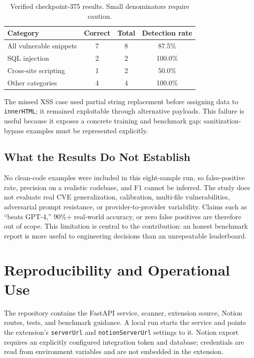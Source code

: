 \documentclass[10pt,conference]{IEEEtran}
\begin{document}
\begin{table}[t]
\caption{Verified checkpoint-375 results. Small denominators require caution.}
\label{tab:results}
\centering
\begin{tabular}{lccc}
\toprule
Category & Correct & Total & Detection rate \\
\midrule
All vulnerable snippets & 7 & 8 & 87.5\% \\
SQL injection & 2 & 2 & 100.0\% \\
Cross-site scripting & 1 & 2 & 50.0\% \\
Other categories & 4 & 4 & 100.0\% \\
\bottomrule
\end{tabular}
\end{table}

The missed XSS case used partial string replacement before assigning data to \texttt{innerHTML}; it remained exploitable through alternative payloads. This failure is useful because it exposes a concrete training and benchmark gap: sanitization-bypass examples must be represented explicitly.

\subsection{What the Results Do Not Establish}
No clean-code examples were included in this eight-sample run, so false-positive rate, precision on a realistic codebase, and F1 cannot be inferred. The study does not evaluate real CVE generalization, calibration, multi-file vulnerabilities, adversarial prompt resistance, or provider-to-provider variability. Claims such as ``beats GPT-4,'' 90\%+ real-world accuracy, or zero false positives are therefore out of scope. This limitation is central to the contribution: an honest benchmark report is more useful to engineering decisions than an unrepeatable leaderboard.

\section{Reproducibility and Operational Use}
The repository contains the FastAPI service, scanner, extension source, Notion routes, tests, and benchmark guidance. A local run starts the service and points the extension's \texttt{serverUrl} and \texttt{notionServerUrl} settings to it. Notion export requires an explicitly configured integration token and database; credentials are read from environment variables and are not embedded in the extension.
\end{document}
